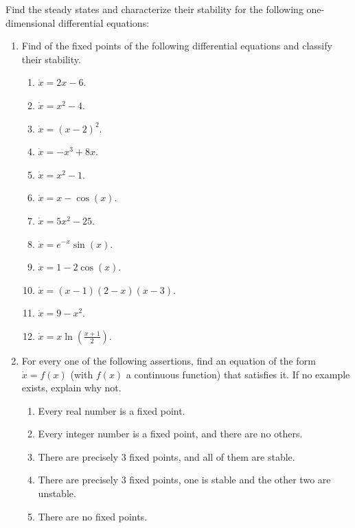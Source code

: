 Find the steady states and characterize their stability for the following one-dimensional differential equations:
\begin{enumerate}
    \item Find of the fixed points of the following differential equations and classify their stability.
    \begin{enumerate}
        \item $\dot{x} = 2 x - 6$. \vspace{2mm}
        \item $\dot{x} = x^2 - 4$. \vspace{2mm}
        \item $\dot{x} = (x - 2)^2$. \vspace{2mm}
        \item $\dot{x} = -x^3 + 8x$.
        \item $\dot{x} = x^2 - 1$.
        \item $\dot{x} = x - \cos(x)$.
        \item $\dot{x} = 5x^2 - 25$.
        \item $\dot{x} = e^{-x} \sin(x)$.
        \item $\dot{x} = 1 - 2 \cos(x)$.
        \item $\dot{x} = (x-1)(2-x)(x-3)$.
        \item $\dot{x} = 9 - x^2$.
        \item $\dot{x} = x \ln\left(\frac{x+1}{2}\right)$.
    \end{enumerate}
    \item For every one of the following assertions, find an equation of the form $\dot{x} = f(x)$ (with $f(x)$  a continuous function) that satisfies it. If no example exists, explain why not.
    \begin{enumerate}
      \item Every real number is a fixed point.
      \item Every integer number is a fixed point, and there are no others.
      \item There are precisely 3 fixed points, and all of them are stable.
      \item There are precisely 3 fixed points, one is stable and the other two are unstable.
      \item There are no fixed points.
    \end{enumerate}
  \end{enumerate}  